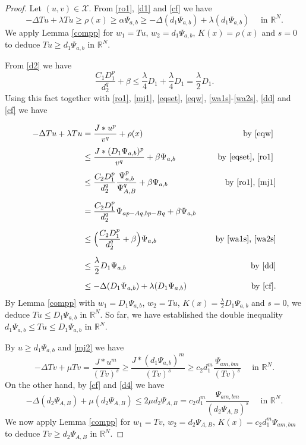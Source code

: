 \documentclass[leqno,12pt]{article}
\newcommand{\R}{\mathbb R}
\numberwithin{equation}{section}
\begin{document}
\begin{proof}
Let $(u,v)\in\mathscr{X}$. From \eqref{ro1}, \eqref{d1} and \eqref{cf} we have
$$
-\Delta Tu+\lambda Tu\geq \rho(x)\geq \alpha \Psi_{a,b}\geq -\Delta (d_1\Psi_{a,b})+\lambda (d_1\Psi_{a,b}) \quad\mbox{ in }\R^N.
$$
We apply Lemma \ref{compp} for $w_1=Tu$, $w_2=d_1\Psi_{a,b}$, $K(x)=\rho(x)$ and $s=0$ to deduce $Tu \geq d_1 \Psi_{a,b}$ in $\R^N$.

From \eqref{d2} we have 
\begin{equation}\label{dd}
\frac{C_1 D_1^p}{d_2^q}+\beta\leq \frac{\lambda}{4} D_1+\frac{\lambda}{4} D_1=\frac{\lambda}{2} D_1.
\end{equation}
Using this fact together with \eqref{ro1}, \eqref{mj1}, \eqref{eqset}, \eqref{eqw}, \eqref{wa1s}-\eqref{wa2s}, \eqref{dd} and \eqref{cf} we have

$$
\begin{aligned}
-\Delta Tu+\lambda Tu &=\frac{J*u^p}{v^q}+\rho(x) & \quad \mbox{ by \eqref{eqw} }\\[0.04in]
&\leq \frac{J*(D_1\Psi_{a,b})^p}{v^q}+\beta \Psi_{a,b} & \quad \mbox{ by \eqref{eqset}, \eqref{ro1} }\\[0.05in]
& \leq \frac{C_2D_1^p}{d_2^q} 
\frac{\Psi_{a,b}^p}{\Psi_{A,B}^q}+\beta \Psi_{a,b} & \quad \mbox{ by \eqref{ro1}, \eqref{mj1}}\\[0.07in]
& = \frac{C_2D_1^p}{d_2^q}  
\Psi_{ap-Aq,bp-Bq}+\beta \Psi_{a,b} & \\[0.07in]
& \leq \Big(\frac{C_2D_1^p}{d_2^q}+\beta\Big) \Psi_{a,b} & \quad \mbox{ by \eqref{wa1s}, \eqref{wa2s}}\\[0.07in]
& \leq \frac{\lambda}{2} D_1 \Psi_{a,b} &\quad \mbox{ by \eqref{dd}}\\[0.07in]
&\leq -\Delta (D_1\Psi_{a,b})+\lambda (D_1\Psi_{a,b}) &\quad \mbox{ by \eqref{cf}}.
\end{aligned}
$$
By Lemma \ref{compp} with $w_1=D_1 \Psi_{a,b}$, $w_2=Tu$, $K(x)=\frac{\lambda}{2} D_1 \Psi_{a,b}$ and $s=0$, we deduce $Tu \leq D_1 \Psi_{a,b}$ in $\R^N$.
So far, we have established the double inequality $d_1 \Psi_{a,b}\leq Tu\leq D_1 \Psi_{a,b}$ in $\R^N$.


By $u\geq d_1 \Psi_{a,b}$ and \eqref{mj2} we have
$$
-\Delta Tv+\mu Tv =\frac{J*u^m}{(Tv)^s}\geq \frac{J*(d_1\Psi_{a,b})^m}{(Tv)^s}\geq c_2d_1^m 
\frac{\Psi_{am,bm}}{(Tv)^s} \quad\mbox{ in }\R^N.
$$
On the other hand, by \eqref{cf} and \eqref{d4} we have
$$
-\Delta (d_2\Psi_{A,B})+\mu (d_2\Psi_{A,B}) \leq 2\mu d_2 \Psi_{A,B}= c_2d_1^m 
\frac{\Psi_{am,bm}}{(d_2 \Psi_{A,B})^s} \quad\mbox{ in }\R^N.
$$
We now apply Lemma \ref{compp} for $w_1=Tv$, $w_2=d_2 \Psi_{A,B}$, $K(x)=c_2d_1^m \Psi_{am,bm}$ to deduce $Tv\geq d_2 \Psi_{A,B}$ in $\R^N$.


\end{proof}
\end{document}
